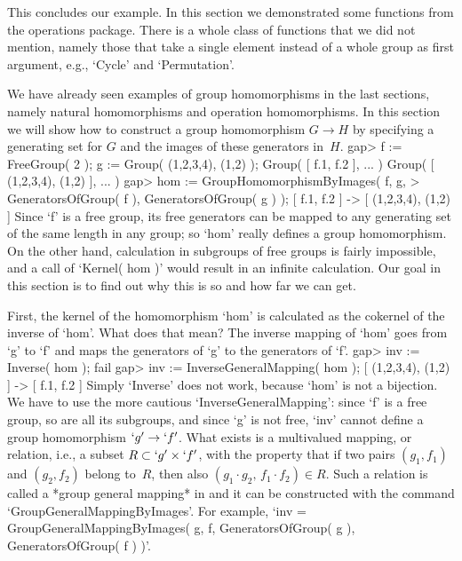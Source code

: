 This  concludes  our  example.   In  this  section  we demonstrated  some
functions  from  the operations  package.   There  is  a  whole class  of
functions that  we  did  not mention, namely  those that  take  a  single
element instead  of a  whole  group  as first argument, e.g., `Cycle' and
`Permutation'.


We  have already    seen examples of  group  homomorphisms   in the  last
sections, namely  natural homomorphisms and  operation homomorphisms.  In
this section we will show how to construct  a group homomorphism $G\to H$
by specifying a generating set for $G$ and the images of these generators
in~$H$.
\beginexample
    gap> f := FreeGroup( 2 ); g := Group( (1,2,3,4), (1,2) );
    Group( [ f.1, f.2 ], ... )
    Group( [ (1,2,3,4), (1,2) ], ... )
    gap> hom := GroupHomomorphismByImages( f, g,
    >           GeneratorsOfGroup( f ), GeneratorsOfGroup( g ) );
    [ f.1, f.2 ] -> [ (1,2,3,4), (1,2) ]
\endexample
Since `f'  is a  free  group, its free  generators  can be mapped  to any
generating set of the same length in any group; so `hom' really defines a
group homomorphism.  On the other  hand, calculation in subgroups of free
groups is fairly impossible, and  a call of  `Kernel( hom )' would result
in an infinite calculation. Our goal  in this section is  to find out why
this is so and how far we can get.

First, the kernel of the homomorphism `hom' is calculated as the cokernel
of the inverse  of `hom'. What   does that mean?  The inverse  mapping of
`hom' goes from  `g'  to  `f' and  maps  the  generators  of `g'   to the
generators of `f'.
\beginexample
    gap> inv := Inverse( hom );
    fail
    gap> inv := InverseGeneralMapping( hom );
    [ (1,2,3,4), (1,2) ] -> [ f.1, f.2 ]
\endexample
Simply `Inverse' does not work, because `hom' is not a bijection. We have
to use the more cautious   `InverseGeneralMapping': since `f' is a   free
group, so are all its subgroups, and since  `g' is not free, `inv' cannot
define a group homomorphism  $`g' \to `f'$.  What exists is a multivalued
mapping, or relation, i.e., a subset $R\subset  `g' \times `f'$, with the
property that  if  two pairs $(g_1,f_1)$  and $(g_2,f_2)$  belong to~$R$,
then also $(g_1\cdot g_2,\,f_1\cdot f_2)\in R$. Such a relation is called
a *group general mapping* in  {\GAP} and it  can be constructed with  the
command    `GroupGeneralMappingByImages'.     For   example,   `inv     =
GroupGeneralMappingByImages(    g,      f,    GeneratorsOfGroup(   g   ),
GeneratorsOfGroup( f ) )'.

